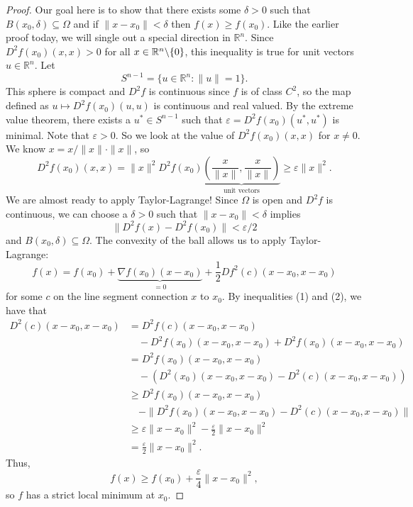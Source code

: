 \documentclass[11pt]{article}
\theoremstyle{definition}
\newcommand{\R}{\mathbb{R}}                      %
\newcommand{\bslash}{\symbol{92}}
\begin{document}
\begin{proof}
    Our goal here is to show that there exists some $\delta>0$ such that $B(x_0,\delta)\subseteq \Omega$ and if $\|x-x_0\|<\delta$ then $f(x)\geq f(x_0)$. Like the earlier proof today, we will single out a special direction in $\R^n$. Since $D^2f(x_0)(x,x)>0$ for all $x\in\R^n\bslash\{0\}$, this inequality is true for unit vectors $u\in\R^n$. Let 
    $$
    S^{n-1}=\{u\in\R^n:\|u\|=1\}.
    $$
    This sphere is compact and $D^2f$ is continuous since $f$ is of class $C^2$, so the map defined as $u\mapsto D^2f(x_0)(u,u)$ is continuous and real valued. By the extreme value theorem, there exists a $u^*\in S^{n-1}$ such that $\varepsilon=D^2f(x_0)(u^*,u^*)$ is minimal. Note that $\varepsilon>0$. So we look at the value of $D^2f(x_0)(x,x)$ for $x\neq 0$. We know $x=x/\|x\|\cdot\|x\|$, so
    \begin{equation}
    D^2f(x_0)(x,x)=\|x\|^2 D^2f(x_0)\underbrace{\left(\frac{x}{\|x\|},\frac{x}{\|x\|}\right)}_{\mbox{unit vectors}}\geq \varepsilon\|x\|^2.
    \end{equation}
    We are almost ready to apply Taylor-Lagrange! Since $\Omega$ is open and $D^2f$ is continuous, we can choose a $\delta>0$ such that $\|x-x_0\|<\delta$ implies 
    \begin{equation}
    \|D^2f(x)-D^2f(x_0)\|<\varepsilon/2
    \end{equation}
    and $B(x_0,\delta)\subseteq\Omega$. The convexity of the ball allows us to apply Taylor-Lagrange:
    $$
    f(x)=f(x_0)+\underbrace{\nabla f(x_0)(x-x_0)}_{=0}+\frac{1}{2}Df^2(c)(x-x_0,x-x_0)
    $$
    for some $c$ on the line segment connection $x$ to $x_0$. By inequalities (1) and (2), we have that
    \begin{align*}
        D^2(c)(x-x_0,x-x_0) & = D^2f(c)(x-x_0,x-x_0)\\
        &\quad-D^2f(x_0)(x-x_0,x-x_0)+D^2f(x_0)(x-x_0,x-x_0)\\
        &= D^2f(x_0)(x-x_0,x-x_0)\\
        &\quad - (D^2(x_0)(x-x_0,x-x_0) - D^2(c)(x-x_0,x-x_0))\\
        &\geq D^2f(x_0)(x-x_0,x-x_0)\\
        &\quad - \|D^2f(x_0)(x-x_0,x-x_0)-D^2(c)(x-x_0,x-x_0)\|\\
        &\geq \varepsilon\|x-x_0\|^2-\frac{\varepsilon}{2}\|x-x_0\|^2\\
        &=\frac{\varepsilon}{2}\|x-x_0\|^2.
    \end{align*}
    Thus,
    $$
    f(x)\geq f(x_0)+\frac{\varepsilon}{4}\|x-x_0\|^2,
    $$
    so $f$ has a strict local minimum at $x_0$.
\end{proof}
\end{document}
